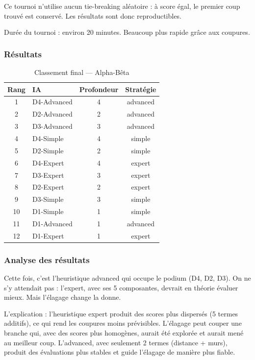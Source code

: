 \documentclass[a4paper, 12pt]{report}
\begin{document}
Ce tournoi n'utilise aucun tie-breaking aléatoire : à score égal, le premier coup trouvé est conservé. Les résultats sont donc reproductibles.

Durée du tournoi : environ 20 minutes. Beaucoup plus rapide grâce aux coupures.

\subsubsection{Résultats}

\begin{table}[H]
\centering
\caption{Classement final --- Alpha-Bêta}
\label{tab:classement-elagage}
\begin{tabular}{clcc}
\toprule
\textbf{Rang} & \textbf{IA} & \textbf{Profondeur} & \textbf{Stratégie} \\
\midrule
1 & D4-Advanced & 4 & advanced \\
2 & D2-Advanced & 2 & advanced \\
3 & D3-Advanced & 3 & advanced \\
4 & D4-Simple & 4 & simple \\
5 & D2-Simple & 2 & simple \\
6 & D4-Expert & 4 & expert \\
7 & D3-Expert & 3 & expert \\
8 & D2-Expert & 2 & expert \\
9 & D3-Simple & 3 & simple \\
10 & D1-Simple & 1 & simple \\
11 & D1-Advanced & 1 & advanced \\
12 & D1-Expert & 1 & expert \\
\bottomrule
\end{tabular}
\end{table}

\subsubsection{Analyse des résultats}

Cette fois, c'est l'heuristique advanced qui occupe le podium (D4, D2, D3). On ne s'y attendait pas : l'expert, avec ses 5 composantes, devrait en théorie évaluer mieux. Mais l'élagage change la donne.

L'explication : l'heuristique expert produit des scores plus dispersés (5 termes additifs), ce qui rend les coupures moins prévisibles. L'élagage peut couper une branche qui, avec des scores plus homogènes, aurait été explorée et aurait mené au meilleur coup. L'advanced, avec seulement 2 termes (distance + murs), produit des évaluations plus stables et guide l'élagage de manière plus fiable.
\end{document}
